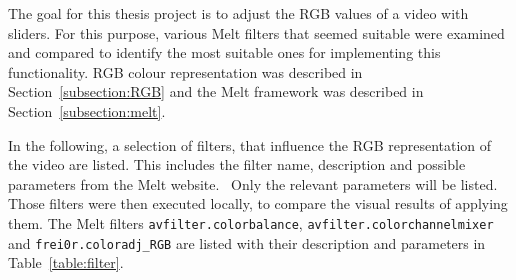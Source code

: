 \documentclass[../MasterThesis.tex]{subfiles}
\begin{document}
The goal for this thesis project is to adjust the RGB values of a video with sliders. For this purpose, various Melt filters that seemed suitable were examined and compared to identify the most suitable ones for implementing this functionality. RGB colour representation was described in Section~\ref{subsection:RGB} and the Melt framework was described in Section~\ref{subsection:melt}.

In the following, a selection of filters, that influence the RGB representation of the video are listed. This includes the filter name, description and possible parameters from the Melt website.~\cite{melt_filters} Only the relevant parameters will be listed.
Those filters were then executed locally, to compare the visual results of applying them.
The Melt filters \texttt{avfilter.colorbalance}, \texttt{avfilter\-.colorchannelmixer} and \texttt{frei0r\-.coloradj\_RGB} are listed with their description and parameters in Table~\ref{table:filter}.
\end{document}

